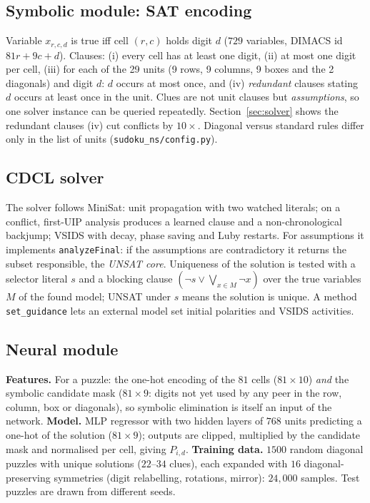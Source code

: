 \documentclass[12pt,a4paper]{article}
\begin{document}
\subsection{Symbolic module: SAT encoding}
Variable $x_{r,c,d}$ is true iff cell $(r,c)$ holds digit $d$ ($729$ variables, DIMACS id $81r+9c+d$).
Clauses: (i) every cell has at least one digit, (ii) at most one digit per cell,
(iii) for each of the 29 units (9 rows, 9 columns, 9 boxes and the 2 diagonals) and digit $d$: $d$ occurs at most once, and
(iv) \emph{redundant} clauses stating $d$ occurs at least once in the unit. Clues are not unit clauses but \emph{assumptions}, so one solver instance
can be queried repeatedly. Section~\ref{sec:solver} shows the redundant clauses (iv) cut conflicts by $10\times$. Diagonal versus standard rules differ only in the list of units
(\texttt{sudoku\_ns/config.py}).

\subsection{CDCL solver}
The solver follows MiniSat: unit propagation with two watched literals; on a conflict, first-UIP analysis produces a learned clause and a non-chronological
backjump; VSIDS with decay, phase saving and Luby restarts. For assumptions it implements \texttt{analyzeFinal}: if the assumptions are contradictory it returns the
subset responsible, the \emph{UNSAT core}. Uniqueness of the solution is tested with a selector literal $s$ and a blocking clause $(\neg s\vee\bigvee_{x\in M}\neg x)$
over the true variables $M$ of the found model; UNSAT under $s$ means the solution is unique. A method \texttt{set\_guidance} lets an external model set initial polarities and VSIDS activities.

\subsection{Neural module}
\textbf{Features.} For a puzzle: the one-hot encoding of the $81$ cells ($81\times10$) \emph{and} the symbolic candidate mask ($81\times9$: digits not yet used by any peer in the row,
column, box or diagonals), so symbolic elimination is itself an input of the network.
\textbf{Model.} MLP regressor with two hidden layers of $768$ units predicting a one-hot of the solution ($81\times9$); outputs are clipped, multiplied by the candidate mask and normalised per cell,
giving $P_{i,d}$.
\textbf{Training data.} $1500$ random diagonal puzzles with unique solutions ($22$--$34$ clues), each expanded with $16$ diagonal-preserving symmetries
(digit relabelling, rotations, mirror): $24{,}000$ samples. Test puzzles are drawn from different seeds.
\end{document}
